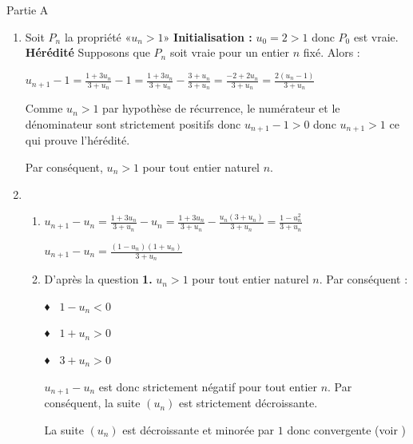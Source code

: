 \begin{corrige}
     \begin{h3}Partie A\end{h3}
     \begin{enumerate}
          \item
          Soit $P_{n}$ la propriété «$u_{n} > 1$»
          \textbf{Initialisation :}
          $u_{0}=2 > 1$ donc $P_{0}$ est vraie.
          \textbf{Hérédité}
          Supposons que $P_{n}$ soit vraie pour un entier $n$ fixé. Alors :
          \par
          $u_{n+1}-1=\frac{1+3u_{n}}{3+u_{n}}-1=\frac{1+3u_{n}}{3+u_{n}}-\frac{3+u_{n}}{3+u_{n}}=\frac{-2+2u_{n}}{3+u_{n}}=\frac{2\left(u_{n}-1\right)}{3+u_{n}}$
          \par
          Comme $u_{n} > 1$ par hypothèse de récurrence, le numérateur et le dénominateur sont strictement positifs donc  $u_{n+1}-1 > 0$ donc $u_{n+1} > 1$ ce qui prouve l'hérédité.
          \par
          Par conséquent, $u_{n} > 1$  pour tout entier naturel $n$.
          \item
          \begin{enumerate}
               \item
               $u_{n+1}- u_{n}=\frac{1+3u_{n}}{3+u_{n}}-u_{n}=\frac{1+3u_{n}}{3+u_{n}}-\frac{u_{n}\left(3+u_{n}\right)}{3+u_{n}}=\frac{1-u_{n}^{2}}{3+u_{n}}$
               \par
               $u_{n+1}- u_{n}=\frac{\left(1-u_{n} \right)\left(1+u_{n}\right)}{3+ u_{n}}$
               \item
               D'après la question \textbf{1.} $u_{n} > 1$  pour tout entier naturel $n$. Par conséquent :
               \par
               ♦  $1-u_{n} < 0$
               \par
               ♦  $1+u_{n} > 0$
               \par
               ♦  $3+u_{n} > 0$
               \par
               $u_{n+1}- u_{n}$ est donc strictement négatif pour tout entier $n$. Par conséquent, la suite $\left(u_{n}\right)$ est strictement décroissante.
               \par
               La suite $\left(u_{n}\right)$ est décroissante et minorée par $1$ donc convergente (voir )
          \end{enumerate}
     \end{enumerate}

\end{corrige}
